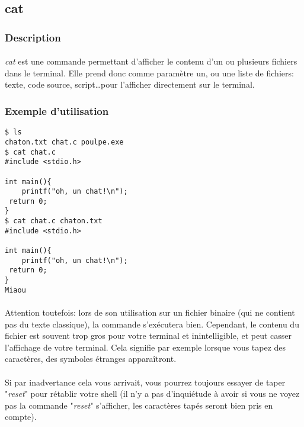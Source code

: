 \subsection{cat}
\subsubsection*{Description}

\paragraph{} \emph{cat} est une commande permettant d'afficher le contenu d'un
ou plusieurs fichiers dans le terminal. Elle prend donc comme paramètre un, ou
une liste de fichiers: texte, code source, script\ldots pour l'afficher
directement sur le terminal.

\subsubsection*{Exemple d'utilisation}

\begin{lstlisting}
$ ls
chaton.txt chat.c poulpe.exe
$ cat chat.c
#include <stdio.h>

int main(){
	printf("oh, un chat!\n");
 return 0;
}
$ cat chat.c chaton.txt
#include <stdio.h>

int main(){
	printf("oh, un chat!\n");
 return 0;
}
Miaou
\end{lstlisting}

\paragraph{} Attention toutefois: lors de son utilisation sur un fichier
binaire (qui ne contient pas du texte classique), la commande s'exécutera bien.
Cependant, le contenu du fichier est souvent trop gros pour votre terminal et
inintelligible, et peut casser l'affichage de votre terminal. Cela signifie par
exemple lorsque vous tapez des caractères, des symboles étranges apparaîtront.

\paragraph{} Si par inadvertance cela vous arrivait, vous pourrez toujours
essayer de taper "\emph{reset}" pour rétablir votre shell (il n'y a pas
d'inquiétude à avoir si vous ne voyez pas la commande "\emph{reset}"
s'afficher, les caractères tapés seront bien pris en compte).
